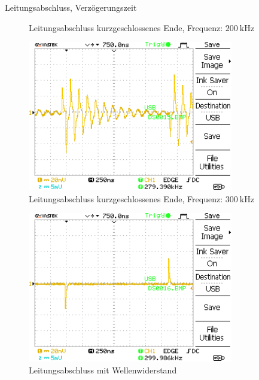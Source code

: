 \documentclass[ngerman]{scrartcl}
\theoremstyle{definition}
\begin{document}
\begin{aufgabe}{Leitungsabschluss, Verzögerungszeit}
\begin{unteraufgabe}
\begin{figure}[H]
					\caption{Leitungsabschluss kurzgeschlossenes Ende, Frequenz: $\SI{200}{\kilo\hertz}$}
					\label{fig:DS0014}
				\end{figure}
				\begin{figure}[H]
					\centering
					\includegraphics[width=0.8\textwidth]{MesswerteVersuch1/DS0015.png}	

					\caption{Leitungsabschluss kurzgeschlossenes Ende, Frequenz: $\SI{300}{\kilo\hertz}$}
					\label{fig:DS0015}
				\end{figure}
				\begin{figure}[H]
					\centering
					\includegraphics[width=0.8\textwidth]{MesswerteVersuch1/DS0016.png}	

					\caption{Leitungsabschluss mit Wellenwiderstand}
					\label{fig:DS0016}
				\end{figure}
			\end{unteraufgabe}
		\end{aufgabe}

\end{document}
